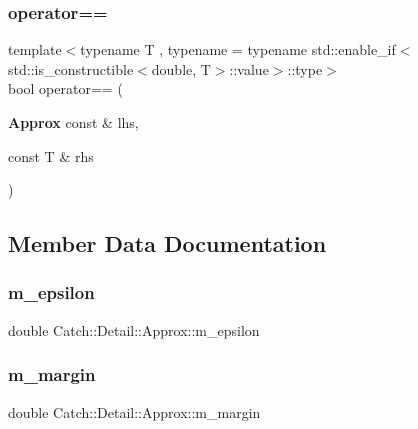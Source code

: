 \mbox{\label{class_catch_1_1_detail_1_1_approx_a0e5ef1957d4c38d7857005909c613743}} 
\subsubsection{operator==\hspace{0.1cm}{\footnotesize\ttfamily [2/2]}}
{\footnotesize\ttfamily template$<$typename T , typename  = typename std\+::enable\+\_\+if$<$std\+::is\+\_\+constructible$<$double, T$>$\+::value$>$\+::type$>$ \\
bool operator== (\begin{DoxyParamCaption}\item[{\textbf{ Approx} const \&}]{lhs,  }\item[{const T \&}]{rhs }\end{DoxyParamCaption})\hspace{0.3cm}{\ttfamily [friend]}}



\subsection{Member Data Documentation}
\mbox{\label{class_catch_1_1_detail_1_1_approx_af17c8e869ae7a55d14b99eb18e178114}} 
\subsubsection{m\_epsilon}
{\footnotesize\ttfamily double Catch\+::\+Detail\+::\+Approx\+::m\+\_\+epsilon\hspace{0.3cm}{\ttfamily [private]}}

\mbox{\label{class_catch_1_1_detail_1_1_approx_a4262a7e821eec507b424c335121ea0d8}} 
\subsubsection{m\_margin}
{\footnotesize\ttfamily double Catch\+::\+Detail\+::\+Approx\+::m\+\_\+margin\hspace{0.3cm}{\ttfamily [private]}}

